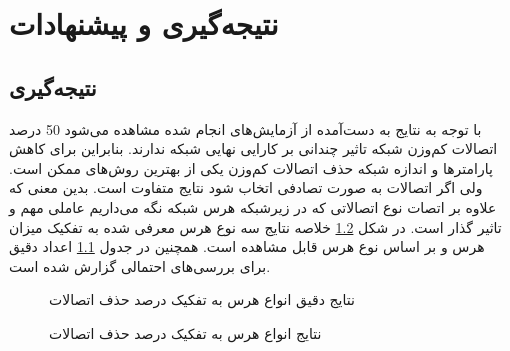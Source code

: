 \chapter{نتیجه‌گیری و پیشنهادات}
\thispagestyle{empty}

\section{نتیجه‌گیری}

با توجه به نتایج به دست‌آمده از آزمایش‌های انجام شده مشاهده می‌شود 50 درصد اتصالات کم‌وزن شبکه
تاثیر چندانی بر کارایی نهایی شبکه ندارند. بنابراین برای کاهش پارامتر‌ها و اندازه شبکه حذف اتصالات کم‌وزن یکی از بهترین روش‌های ممکن است. ولی اگر اتصالات به صورت تصادفی اتخاب شود نتایج متفاوت است. بدین معنی که علاوه بر اتصات نوع اتصالاتی که در زیرشبکه هرس شبکه نگه می‌داریم عاملی مهم و تاثیر گذار است. در شکل \ref{ex_result} خلاصه نتایج سه نوع هرس معرفی شده به تفکیک میزان هرس و بر اساس نوع هرس قابل مشاهده است. همچنین در جدول \ref{res_all} اعداد دقیق برای بررسی‌های احتمالی گزارش شده است.

\begin{figure}[H]
	\caption{نتایج دقیق انواع هرس به تفکیک درصد حذف اتصالات}
	\label{res_all}
\end{figure}

\begin{figure}[H]
	\caption{نتایج انواع هرس به تفکیک درصد حذف اتصالات}
	\label{ex_result}
\end{figure}

